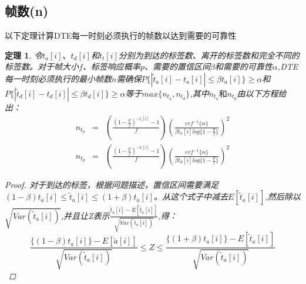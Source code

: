 \documentclass[UTF8]{ctexart}
\newtheorem{theorem}{定理}
\newtheorem*{proof}{证明}
\begin{document}
\subsection{帧数(n)}

以下定理计算DTE每一时刻必须执行的帧数以达到需要的可靠性
\begin{theorem}
	令$t_a[i]、t_d[i]$和$t_t[i]$分别为到达的标签数、离开的标签数和完全不同的标签数。对于帧大小$f$、标签响应概率$p$、需要的置信区间$\beta$和需要的可靠性$\alpha$,DTE每一时刻必须执行的最小帧数$n$需确保$P\{|\widetilde{t}_a[i]-t_a[i]|\le \beta t_a[i]\}\ge \alpha$和$P\{|\widetilde{t}_d[i]-t_d[i]|\le \beta t_d[i]\}\ge \alpha$等于$max\{n_{t_a},n_{t_d}\}$,其中$n_{t_a}和n_{t_d}$由以下方程给出：
	\begin{eqnarray}
	n_{t_a}&=&\left(\frac{(1-\frac{p}{f})^{-t_i[i]}-1}{f}\right)\left(\frac{erf^{-1}\{\alpha\}}{\beta t_a[i]log\{1-\frac{p}{f}\}}\right)^2\label{twenty-one}\\
	n_{t_d}&=&\left(\frac{(1-\frac{p}{f})^{-t_t[i]}-1}{f}\right)\left(\frac{erf^{-1}\{\alpha\}}{\beta t_d[i]log\{1-\frac{p}{f}\}}\right)^2\label{twenty-two}
	\end{eqnarray}
	\begin{proof}
		对于到达的标签，根据问题描述，置信区间需要满足$(1-\beta)t_a[i]\le \widetilde{t}_a[i]\le  (1+\beta )t_a[i]$。从这个式子中减去$E[\widetilde{t}_a[i]]$,然后除以$\sqrt{Var(\widetilde{t}_a[i])}$,并且让Z表示$\frac{\widetilde{t}_a[i]-E[\widetilde{t}_a[i]]}{\sqrt{Var(\widetilde{t}_a[i])}}$,得：
		\begin{displaymath}
		\frac{\{(1-\beta)t_a[i]\}-E[\widetilde{a}[i]]}{\sqrt{Var(\widetilde{t}_a[i])}}\le Z \le \frac{\{(1+\beta)t_a[i]\}-E[\widetilde{t}_a[i]]}{\sqrt{Var(\widetilde{t}_a[i])}}
		\end{displaymath}
		

\end{proof}
\end{theorem}
\end{document}
